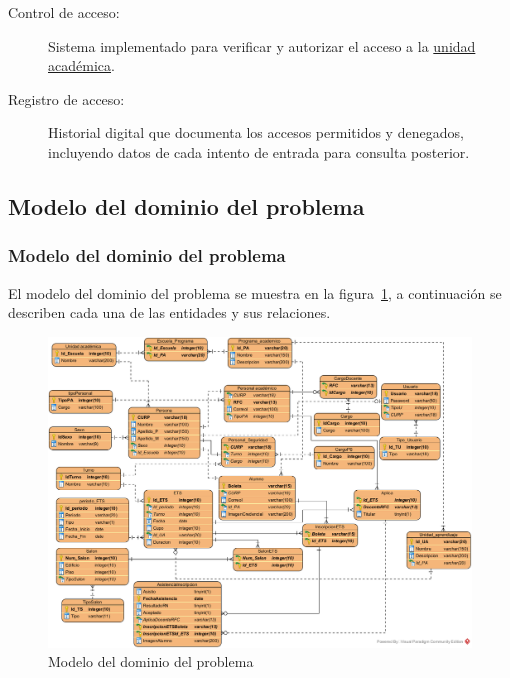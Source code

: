 \begin{description}
	\item[\hypertarget{tControlAcceso}{Control de acceso:}] Sistema implementado para verificar y autorizar el acceso a la \hyperlink{tUnidadAcademica}{unidad académica}.
	
	\item[\hypertarget{tRegistroAcceso}{Registro de acceso:}] Historial digital que documenta los accesos permitidos y denegados, incluyendo datos de cada intento de entrada para consulta posterior.
	
\end{description}


\subsection{Modelo del dominio del problema}
\label{sec:terminosDeNegocio}


\subsubsection{Modelo del dominio del problema}

El modelo del dominio del problema se muestra en la figura~\ref{fig:modeloDeDominio}, a continuación se describen cada una de las entidades y sus relaciones.

\newpage

\begin{figure}[htbp!]
	\begin{center}
		\includegraphics[angle=90,width=.85\textwidth]{images/DER}
		\caption{Modelo del dominio del problema}
		\label{fig:modeloDeDominio}
	\end{center}
\end{figure}

